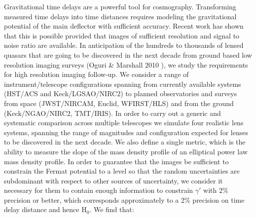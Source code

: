 \documentclass[a4paper,11pt]{article}
\begin{document}
Gravitational time delays are a powerful tool for
cosmography. Transforming measured time delays into time distances
requires modeling the gravitational potential of the main deflector
with sufficient accuracy. Recent work has shown that this is possible
provided that images of sufficient resolution and signal to noise
ratio are available. In anticipation of the hundreds to thousands of
lensed quasars that are going to be discovered in the next decade from
ground based low resolution imaging surveys
(Oguri \& Marshall 2010 \cite{2010MNRAS.405.2579O}),
we study the requirements for high
resolution imaging follow-up. We consider a range of
instrument/telescope configurations spanning from currently available
systems (HST/ACS and Keck/LGSAO/NIRC2) to planned observatories and
surveys from space (JWST/NIRCAM, Euclid, WFIRST/HLS) and from the
ground (Keck/NGAO/NIRC2, TMT/IRIS). In order to carry out a generic
and systematic comparison across multiple telescopes we simulate four
realistic lens systems, spanning the range of magnitudes and
configuration expected for lenses to be discovered in the next
decade. We also define a single metric, which is the ability to
measure the slope of the mass density profile of an elliptical power
law mass density profile. In order to guarantee that the images be
sufficient to constrain the Fermat potential to a level so that the
random uncertainties are subdominant with respect to other sources of
uncertainty, we consider it necessary for them to contain enough
information to constrain $\gamma'$ with 2\% precision or better, which
corresponds approximately to a 2\% precision on time delay distance
and hence H$_0$. We find that:
\end{document}
